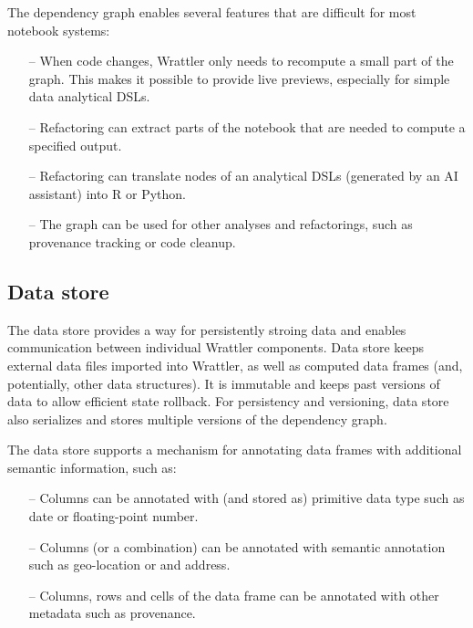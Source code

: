 \documentclass[sigplan,preprint,10pt]{acmart}\settopmatter{printfolios=true,printccs=false,printacmref=false}
\theoremstyle{plain}
\theoremstyle{definition}
\begin{document}
The dependency graph enables several features that are difficult for most notebook systems:
%
\begin{itemize}
\item[--] When code changes, Wrattler only needs to recompute a small part of the graph.
  This makes it possible to provide live previews, especially for simple data analytical DSLs.
\vspace{-0.85em}
\item[--] Refactoring can extract parts of the notebook that
  are needed to compute a specified output.
\vspace{0.25em}
\item[--] Refactoring can translate nodes of an analytical DSLs (generated by an AI assistant) into R or Python.
\vspace{0.25em}
\item[--] The graph can be used for other analyses and refactorings, such as provenance tracking
  or code cleanup.
\end{itemize}

\subsection{Data store}
\label{sec:wrattler-ds}

The data store provides a way for persistently stroing data and enables communication between 
individual Wrattler components. Data store keeps external data files imported into Wrattler,
as well as computed data frames (and, potentially, other data structures). It is immutable 
and keeps past versions of data to allow efficient state rollback. For persistency and versioning, 
data store also serializes and stores multiple versions of the dependency graph.

The data store supports a mechanism for annotating data frames with additional semantic information, such as:
%
\begin{itemize}
\item[--] Columns can be annotated with (and stored as) primitive data type such as date or floating-point number.
\vspace{0.25em}
\item[--] Columns (or a combination) can be annotated with semantic annotation such as geo-location or and address.
\vspace{-0.85em}
\item[--] Columns, rows and cells of the data frame can be annotated with other metadata such as provenance.
\end{itemize}
\end{document}
